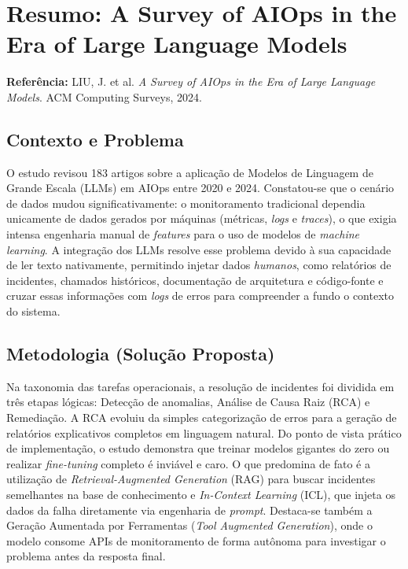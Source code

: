 \documentclass[12pt, a4paper]{article}
\begin{document}
\section*{Resumo: A Survey of AIOps in the Era of Large Language Models}
\label{sec:resumo_survey_llm_aiops}

\noindent\textbf{Referência:} LIU, J. et al. \textit{A Survey of AIOps in the Era of Large Language Models}. ACM Computing Surveys, 2024.

\subsection*{Contexto e Problema}
O estudo revisou 183 artigos sobre a aplicação de Modelos de Linguagem de Grande Escala (LLMs) em AIOps entre 2020 e 2024. Constatou-se que o cenário de dados mudou significativamente: o monitoramento tradicional dependia unicamente de dados gerados por máquinas (métricas, \textit{logs} e \textit{traces}), o que exigia intensa engenharia manual de \textit{features} para o uso de modelos de \textit{machine learning}. A integração dos LLMs resolve esse problema devido à sua capacidade de ler texto nativamente, permitindo injetar dados \textit{humanos}, como relatórios de incidentes, chamados históricos, documentação de arquitetura e código-fonte e cruzar essas informações com \textit{logs} de erros para compreender a fundo o contexto do sistema.

\subsection*{Metodologia (Solução Proposta)}
Na taxonomia das tarefas operacionais, a resolução de incidentes foi dividida em três etapas lógicas: Detecção de anomalias, Análise de Causa Raiz (RCA) e Remediação. A RCA evoluiu da simples categorização de erros para a geração de relatórios explicativos completos em linguagem natural. 
Do ponto de vista prático de implementação, o estudo demonstra que treinar modelos gigantes do zero ou realizar \textit{fine-tuning} completo é inviável e caro. O que predomina de fato é a utilização de \textit{Retrieval-Augmented Generation} (RAG) para buscar incidentes semelhantes na base de conhecimento e \textit{In-Context Learning} (ICL), que injeta os dados da falha diretamente via engenharia de \textit{prompt}. Destaca-se também a Geração Aumentada por Ferramentas (\textit{Tool Augmented Generation}), onde o modelo consome APIs de monitoramento de forma autônoma para investigar o problema antes da resposta final.
\end{document}
